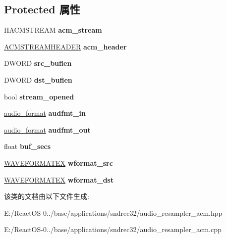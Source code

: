 \subsection*{Protected 属性}
\begin{DoxyCompactItemize}
\item 
\mbox{\label{classaudio__resampler__acm_ad9288334f8a75257c16359b11d8a57f0}} 
H\+A\+C\+M\+S\+T\+R\+E\+AM {\bfseries acm\+\_\+stream}
\item 
\mbox{\label{classaudio__resampler__acm_a3d0ab9a48e10c6797af38b52c3b204f3}} 
\hyperlink{struct___a_c_m_s_t_r_e_a_m_h_e_a_d_e_r}{A\+C\+M\+S\+T\+R\+E\+A\+M\+H\+E\+A\+D\+ER} {\bfseries acm\+\_\+header}
\item 
\mbox{\label{classaudio__resampler__acm_a0f3789d2272f1df1d7e2332ead3ad923}} 
D\+W\+O\+RD {\bfseries src\+\_\+buflen}
\item 
\mbox{\label{classaudio__resampler__acm_a15a50c994e456a96f69d299b1afea263}} 
D\+W\+O\+RD {\bfseries dst\+\_\+buflen}
\item 
\mbox{\label{classaudio__resampler__acm_addfce3c21b6fd631a29bf85abd270b17}} 
bool {\bfseries stream\+\_\+opened}
\item 
\mbox{\label{classaudio__resampler__acm_a7b5ceef5347761ca1b79940aae0fa63c}} 
\hyperlink{classaudio__format}{audio\+\_\+format} {\bfseries audfmt\+\_\+in}
\item 
\mbox{\label{classaudio__resampler__acm_a52f46c38426b5e451f4de8d92f7344c1}} 
\hyperlink{classaudio__format}{audio\+\_\+format} {\bfseries audfmt\+\_\+out}
\item 
\mbox{\label{classaudio__resampler__acm_a0b32394bbe3357efefc4969dacce8595}} 
float {\bfseries buf\+\_\+secs}
\item 
\mbox{\label{classaudio__resampler__acm_af7fed8d92ac82fb41398c6168306eab6}} 
\hyperlink{struct_w_a_v_e_f_o_r_m_a_t_e_x}{W\+A\+V\+E\+F\+O\+R\+M\+A\+T\+EX} {\bfseries wformat\+\_\+src}
\item 
\mbox{\label{classaudio__resampler__acm_afdb6f8e1af50b7322d0db1928435ba2e}} 
\hyperlink{struct_w_a_v_e_f_o_r_m_a_t_e_x}{W\+A\+V\+E\+F\+O\+R\+M\+A\+T\+EX} {\bfseries wformat\+\_\+dst}
\end{DoxyCompactItemize}


该类的文档由以下文件生成\+:\begin{DoxyCompactItemize}
\item 
E\+:/\+React\+O\+S-\/0../base/applications/sndrec32/audio\+\_\+resampler\+\_\+acm.\+hpp\item 
E\+:/\+React\+O\+S-\/0../base/applications/sndrec32/audio\+\_\+resampler\+\_\+acm.\+cpp\end{DoxyCompactItemize}
